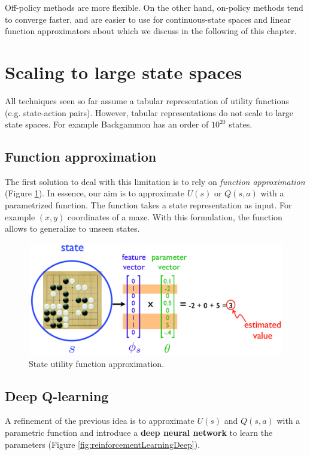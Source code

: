 Off-policy methods are more flexible. On the other hand, on-policy methods tend to converge faster, and are easier to use for continuous-state spaces and linear function approximators about which we discuss in the following of this chapter.

\section{Scaling to large state spaces}
All techniques seen so far assume a tabular representation of utility functions (e.g. state-action pairs). However, tabular representations do not scale to large state spaces. For example Backgammon has an order of $10^{20}$ states.

\subsection{Function approximation}
The first solution to deal with this limitation is to rely on \textit{function approximation} (Figure \ref{fig:functionApproximation}). In essence, our aim is to approximate $U(s)$ or $Q(s,a)$ with a parametrized function. The function takes a state representation as input. For example $(x,y)$ coordinates of a maze. With this formulation, the function allows to generalize to unseen states.

\begin{figure}
    \centering
    \includegraphics[width=\textwidth]{images/functionApproximation.png}
    \caption{State utility function approximation.}
    \label{fig:functionApproximation}
\end{figure}

\subsection{Deep Q-learning}
A refinement of the previous idea is to approximate $U(s)$ and $Q(s,a)$ with a parametric function and introduce a \textbf{deep neural network} to learn the parameters (Figure \ref{fig:reinforcementLearningDeep}).

